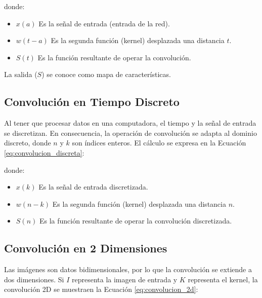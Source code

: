 donde:

\begin{itemize}
    \item  $x(a)$ Es la señal de entrada (entrada de la red).
    \item  $w(t-a)$ Es la segunda función (kernel) desplazada una distancia $t$.
    \item  $S(t)$ Es la función resultante de operar la convolución.
\end{itemize}

La salida ($S$) se conoce como mapa de características.


\subsection{Convolución en Tiempo Discreto}

Al tener que procesar datos en una computadora, el tiempo y la señal de entrada se discretizan. En consecuencia, la operación de convolución se adapta al dominio discreto, donde $n$ y $k$ son índices enteros. El cálculo se expresa en la Ecuación \ref{eq:convolucion_discreta}:


donde:

\begin{itemize}
    \item  $x(k)$ Es la señal de entrada discretizada.
    \item  $w(n-k)$ Es la segunda función (kernel) desplazada una distancia $n$.
    \item  $S(n)$ Es la función resultante de operar la convolución discretizada.
\end{itemize}

\subsection{Convolución en 2 Dimensiones}

Las imágenes son datos bidimensionales, por lo que la convolución se extiende a dos dimensiones. Si $I$ representa la imagen de entrada y $K$ representa el kernel, la convolución 2D se muestraen la Ecuación \ref{eq:convolucion_2d}:




